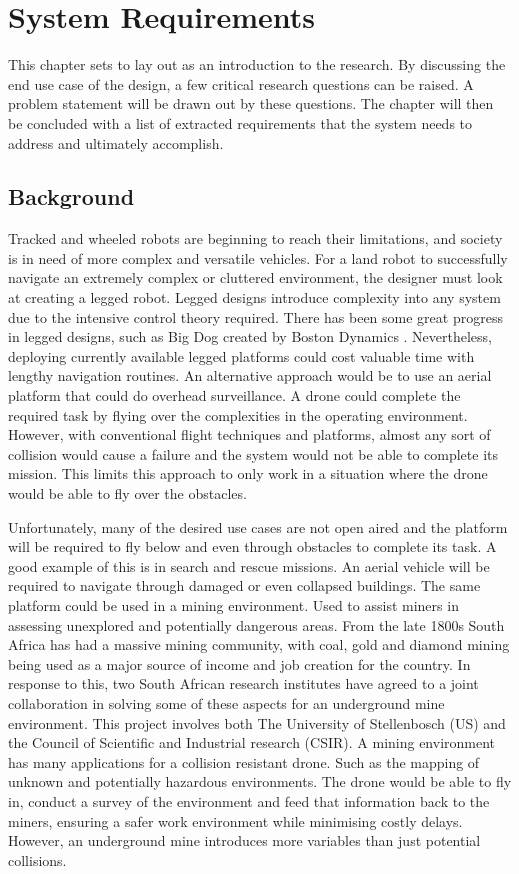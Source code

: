 \chapter{System Requirements}
This chapter sets to lay out as an introduction to the research. By discussing the end use case of the design, a few critical research questions can be raised. A problem statement will be drawn out by these questions. The chapter will then be concluded with a list of extracted requirements that the system needs to address and ultimately accomplish. 

	\section{Background}
	Tracked and wheeled robots are beginning to reach their limitations, and society is in need of more complex and versatile vehicles. For a land robot to successfully navigate an extremely complex or cluttered environment, the designer must look at creating a legged robot. Legged designs introduce complexity into any system due to the intensive control theory required. There has been some great progress in legged designs, such as Big Dog created by Boston Dynamics \cite{BigDog}. Nevertheless, deploying currently available legged platforms could cost valuable time with lengthy navigation routines. An alternative approach would be to use an aerial platform that could do overhead surveillance. A drone could complete the required task by flying over the complexities in the operating environment. However, with conventional flight techniques and platforms, almost any sort of collision would cause a failure and the system would not be able to complete its mission. This limits this approach to only work in a situation where the drone would be able to fly over the obstacles. 

	Unfortunately, many of the desired use cases are not open aired and the platform will be required to fly below and even through obstacles to complete its task. A good example of this is in search and rescue missions. An aerial vehicle will be required to navigate through damaged or even collapsed buildings. The same platform could be used in a mining environment. Used to assist miners in assessing unexplored and potentially dangerous areas. 
	From the late 1800s South Africa has had a massive mining community, with coal, gold and diamond mining being used as a major source of income and job creation for the country. In response to this, two South African research institutes have agreed to a joint collaboration in solving some of these aspects for an underground mine environment. This project involves both The University of Stellenbosch (US) and the Council of Scientific and Industrial research (CSIR). A mining environment has many applications for a collision resistant drone. Such as the mapping of unknown and potentially hazardous environments. The drone would be able to fly in, conduct a survey of the environment and feed that information back to the miners, ensuring a safer work environment while minimising costly delays. However, an underground mine introduces more variables than just potential collisions.

